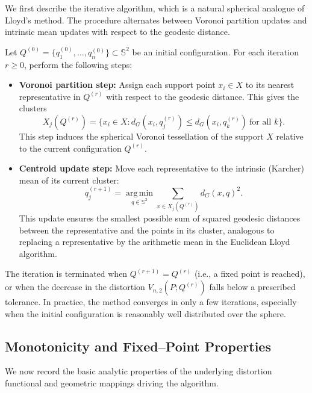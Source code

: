 \documentclass[12pt, reqno]{amsart}
\theoremstyle{plain}
\theoremstyle{definition}
\newcommand{\D}[1]{\mathbb{#1}}%
\begin{document}
We first describe the iterative algorithm, which is a natural spherical analogue of Lloyd’s method.  
The procedure alternates between Voronoi partition updates and intrinsic mean updates with respect to the geodesic distance.


Let $ {Q}^{(0)} = \{ {q}^{(0)}_1, \ldots,  {q}^{(0)}_n\} \subset \D S^2$ be an initial configuration. For each iteration
$r \ge 0$, perform the following steps:

\begin{itemize}
\item[(i)] \textbf{Voronoi partition step:} Assign each support point $ {x}_i \in  {X}$ to its nearest representative
in $ {Q}^{(r)}$ with respect to the geodesic distance. This gives the clusters
\[
 {X}_j( {Q}^{(r)}) = \{ {x}_i \in  {X} : d_G( {x}_i,  {q}^{(r)}_j) \le d_G( {x}_i,  {q}^{(r)}_k)
\ \text{for all } k\}.
\]
This step induces the spherical Voronoi tessellation of the support $ {X}$ relative to the current
configuration $ {Q}^{(r)}$.

\item[(ii)] \textbf{Centroid update step:} Move each representative to the intrinsic (Karcher) mean of its current
cluster:
\[
 {q}^{(r+1)}_j = \operatorname*{arg\,min}_{ {q} \in \D S^2} \sum_{ {x} \in  {X}_j( {Q}^{(r)})} d_G( {x},  {q})^2.
\]
This update ensures the smallest possible sum of squared geodesic distances between the representative
and the points in its cluster, analogous to replacing a representative by the arithmetic mean in the
Euclidean Lloyd algorithm.
\end{itemize}

The iteration is terminated when $ {Q}^{(r+1)} =  {Q}^{(r)}$ (i.e., a fixed point is reached), or when the decrease in
the distortion $V_{n,2}(P; {Q}^{(r)})$ falls below a prescribed tolerance. In practice, the method converges
in only a few iterations, especially when the initial configuration is reasonably well distributed over the sphere.

\medskip
\subsection{Monotonicity and Fixed--Point Properties}

We now record the basic analytic properties of the underlying distortion functional and geometric mappings driving the algorithm.
\end{document}
